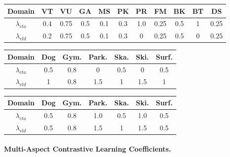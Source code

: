 \documentclass[10pt,twocolumn,letterpaper]{article}
\begin{document}
\begin{table*}[t]
\begin{minipage}[c]{\textwidth}
    \begin{minipage}{0.35\textwidth}
    \makeatletter{}
    \centering
    \footnotesize
    \setlength{\tabcolsep}{2pt}
    \begin{tabular}{c | c c c c c c c c c c}
    \toprule
    Domain & VT & VU & GA & MS & PK & PR &FM & BK & BT & DS \\
    \midrule
    $\lambda_{cta}$ & 0.4 & 0.75 & 0.5 & 0.1 & 0.3 & 1.0 &0.25 &0.5 &1 &0.25 \\
    \midrule
    $\lambda_{vld}$ & 0.2 & 0.75 & 0.5 & 0.1 & 0.3 & 0 &0.25 &0.5 &0 &0.25 \\
    \bottomrule
    \end{tabular}
    \caption{\textbf{$\lambda_{cta}$ and $\lambda_{vld}$ for TVSum.}}
    \label{tab:sup_tvsum_loss}
    \end{minipage}
    \hspace{0.04\textwidth}
    \begin{minipage}{0.3
    \textwidth}
    \makeatletter{}
    \centering
    \footnotesize
    \setlength{\tabcolsep}{2pt}
    \vspace{10pt}
    \begin{tabular}{c | c c c c c c}
    \toprule
    Domain & Dog & Gym. & Park. & Ska. & Ski. & Surf. \\
    \midrule
    $\lambda_{cta}$ & 0.5 & 0.8 & 0 & 0.5 & 0 & 0.5 \\
    \midrule
    $\lambda_{vld}$ & 1 & 0.8 & 1.5 & 1 & 1.5 & 1 \\
    \bottomrule
    \end{tabular}
    \caption{\textbf{$\lambda_{cta}$ and $\lambda_{vld}$ for YoutubeHL using SF+C feature.}}
    \label{tab:sup_youtubehl_sfc_loss}
    \end{minipage}
    \hspace{0.01\textwidth}
    \begin{minipage}{0.3\textwidth}
    \makeatletter{}
    \centering
    \footnotesize
    \vspace{10pt}
    \setlength{\tabcolsep}{2pt}
    \begin{tabular}{c | c c c c c c}
    \toprule
    Domain & Dog & Gym. & Park. & Ska. & Ski. & Surf. \\
    \midrule
    $\lambda_{cta}$ & 0.5 & 0.8 & 1.0 & 0.5 & 1.0 & 0.5 \\
    \midrule
    $\lambda_{vld}$ & 0.5 & 0.8 & 1.5 & 1 & 1.5 & 0.5 \\
    \bottomrule
    \end{tabular}
    \caption{\textbf{$\lambda_{cta}$ and $\lambda_{vld}$ for YoutubeHL using I3D feature.}}
    \label{tab:sup_youtubehl_i3d_loss}
    \end{minipage}
\end{minipage}
\end{table*} \paragraph{Multi-Aspect Contrastive Learning Coefficients.}
\end{document}
